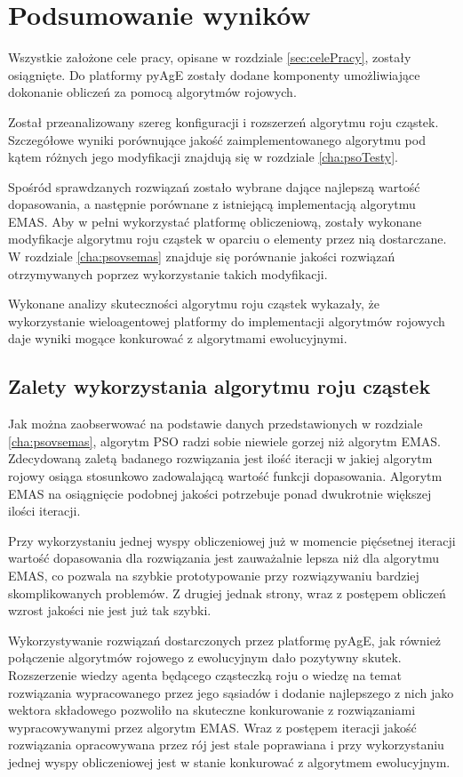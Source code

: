 \chapter{Podsumowanie wyników}
\label{cha:podsumowanie}

Wszystkie założone cele pracy, opisane w rozdziale \ref{sec:celePracy}, zostały osiągnięte. Do platformy pyAgE zostały dodane komponenty umożliwiające dokonanie obliczeń za pomocą algorytmów rojowych.

Został przeanalizowany szereg konfiguracji i rozszerzeń algorytmu roju cząstek. Szczegółowe wyniki porównujące jakość zaimplementowanego algorytmu pod kątem różnych jego modyfikacji znajdują się w rozdziale \ref{cha:psoTesty}. 

Spośród sprawdzanych rozwiązań zostało wybrane dające najlepszą wartość dopasowania, a następnie porównane z istniejącą implementacją algorytmu EMAS. Aby w pełni wykorzystać platformę obliczeniową, zostały wykonane modyfikacje algorytmu roju cząstek w oparciu o elementy przez nią dostarczane. W rozdziale \ref{cha:psovsemas} znajduje się porównanie jakości rozwiązań otrzymywanych poprzez wykorzystanie takich modyfikacji.

Wykonane analizy skuteczności algorytmu roju cząstek wykazały, że wykorzystanie wieloagentowej platformy do implementacji algorytmów rojowych daje wyniki mogące konkurować z algorytmami ewolucyjnymi. 


\section{Zalety wykorzystania algorytmu roju cząstek}

Jak można zaobserwować na podstawie danych przedstawionych w rozdziale \ref{cha:psovsemas}, algorytm PSO radzi sobie niewiele gorzej niż algorytm EMAS. Zdecydowaną zaletą badanego rozwiązania jest ilość iteracji w jakiej algorytm rojowy osiąga stosunkowo zadowalającą wartość funkcji dopasowania. Algorytm EMAS na osiągnięcie podobnej jakości potrzebuje ponad dwukrotnie większej ilości iteracji.

Przy wykorzystaniu jednej wyspy obliczeniowej już w momencie pięćsetnej iteracji wartość dopasowania dla rozwiązania jest zauważalnie lepsza niż dla algorytmu EMAS, co pozwala na szybkie prototypowanie przy rozwiązywaniu bardziej skomplikowanych problemów. Z drugiej jednak strony, wraz z postępem obliczeń wzrost jakości nie jest już tak szybki.

Wykorzystywanie rozwiązań dostarczonych przez platformę pyAgE, jak również połączenie algorytmów rojowego z ewolucyjnym dało pozytywny skutek. Rozszerzenie wiedzy agenta będącego cząsteczką roju o wiedzę na temat rozwiązania wypracowanego przez jego sąsiadów i dodanie najlepszego z nich jako wektora składowego pozwoliło na skuteczne konkurowanie z rozwiązaniami wypracowywanymi przez algorytm EMAS. Wraz z postępem iteracji jakość rozwiązania opracowywana przez rój jest stale poprawiana i przy wykorzystaniu jednej wyspy obliczeniowej jest w stanie konkurować z algorytmem ewolucyjnym.

